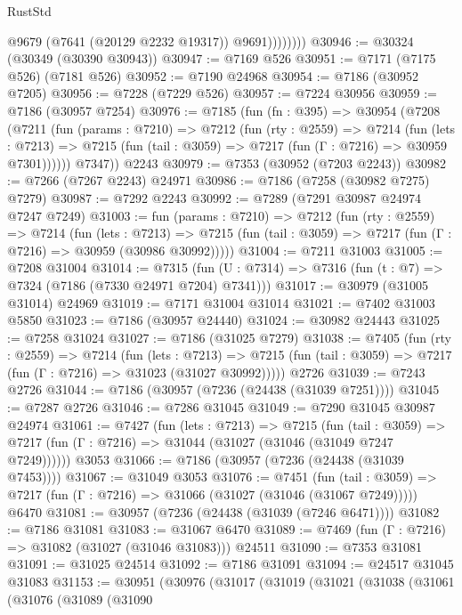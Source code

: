 \begin{lexlean}{RustStd}
\begin{coremodule}
{\begin{coremodule}
{{{{{{{{{{{{{{{{{{{{{{{{{{{{{{{{                    @9679
                    (@7641 (@20129 @2232 @19317))
                    @9691))))))))
@30946 := @30324 (@30349 (@30390 @30943))
@30947 := @7169 @526
@30951 := @7171 (@7175 @526) (@7181 @526)
@30952 := @7190 @24968
@30954 := @7186 (@30952 @7205)
@30956 := @7228 (@7229 @526)
@30957 := @7224 @30956
@30959 := @7186 (@30957 @7254)
@30976 := @7185
    (fun (fn : @395) =>
    @30954
      (@7208
        (@7211
          (fun (params : @7210) =>
          @7212
            (fun (rty : @2559) =>
            @7214
              (fun (lets : @7213) =>
              @7215 (fun (tail : @3059) => @7217 (fun (Γ : @7216) => @30959 @7301))))))
        @7347))
    @2243
@30979 := @7353 (@30952 (@7203 @2243))
@30982 := @7266 (@7267 @2243) @24971
@30986 := @7186 (@7258 (@30982 @7275) @7279)
@30987 := @7292 @2243
@30992 := @7289 (@7291 @30987 @24974 @7247 @7249)
@31003 := fun (params : @7210) =>
  @7212
    (fun (rty : @2559) =>
    @7214
      (fun (lets : @7213) =>
      @7215 (fun (tail : @3059) => @7217 (fun (Γ : @7216) => @30959 (@30986 @30992)))))
@31004 := @7211 @31003
@31005 := @7208 @31004
@31014 := @7315
    (fun (U : @7314) => @7316 (fun (t : @7) => @7324 (@7186 (@7330 @24971 @7204) @7341)))
@31017 := @30979 (@31005 @31014) @24969
@31019 := @7171 @31004 @31014
@31021 := @7402 @31003 @5850
@31023 := @7186 (@30957 @24440)
@31024 := @30982 @24443
@31025 := @7258 @31024
@31027 := @7186 (@31025 @7279)
@31038 := @7405
    (fun (rty : @2559) =>
    @7214
      (fun (lets : @7213) =>
      @7215 (fun (tail : @3059) => @7217 (fun (Γ : @7216) => @31023 (@31027 @30992)))))
    @2726
@31039 := @7243 @2726
@31044 := @7186 (@30957 (@7236 (@24438 (@31039 @7251))))
@31045 := @7287 @2726
@31046 := @7286 @31045
@31049 := @7290 @31045 @30987 @24974
@31061 := @7427
    (fun (lets : @7213) =>
    @7215
      (fun (tail : @3059) =>
      @7217 (fun (Γ : @7216) => @31044 (@31027 (@31046 (@31049 @7247 @7249))))))
    @3053
@31066 := @7186 (@30957 (@7236 (@24438 (@31039 @7453))))
@31067 := @31049 @3053
@31076 := @7451
    (fun (tail : @3059) => @7217 (fun (Γ : @7216) => @31066 (@31027 (@31046 (@31067 @7249)))))
    @6470
@31081 := @30957 (@7236 (@24438 (@31039 (@7246 @6471))))
@31082 := @7186 @31081
@31083 := @31067 @6470
@31089 := @7469 (fun (Γ : @7216) => @31082 (@31027 (@31046 @31083))) @24511
@31090 := @7353 @31081
@31091 := @31025 @24514
@31092 := @7186 @31091
@31094 := @24517 @31045 @31083
@31153 := @30951
    (@30976
      (@31017
        (@31019
          (@31021
            (@31038
              (@31061
                (@31076
                  (@31089
                    (@31090
}}}}}}}}}}}}}}}}}}}}}}}}}}}}}}}}
\end{coremodule}}
\end{coremodule}
\end{lexlean}
